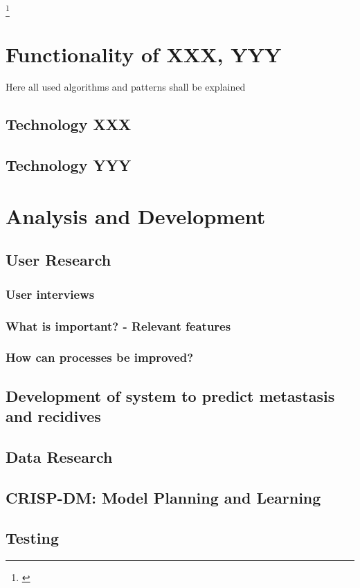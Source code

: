 \footnote{\cite{vijini_gen_alg}}


\chapter{Functionality of XXX, YYY}
Here all used algorithms and patterns shall be explained

\section{Technology XXX}
\section{Technology YYY}


\chapter{Analysis and Development}

\section{User Research}

\subsection{User interviews}
\subsection{What is important? - Relevant features}
\subsection{How can processes be improved?}


\section{Development of system to predict metastasis and recidives} 

\section{Data Research}
\section{\ac{CRISP-DM}: Model Planning and Learning}
\section{Testing}
